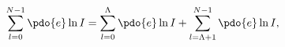 \begin{equation}
\label{Eq_A03}
\sum^{N-1}_{l=0} \pdo{e} \ln I
  = \sum^{\Lambda}_{l=0} \pdo{e} \ln I
    + \sum^{N-1}_{l=\Lambda + 1} \pdo{e} \ln I,
\end{equation}

